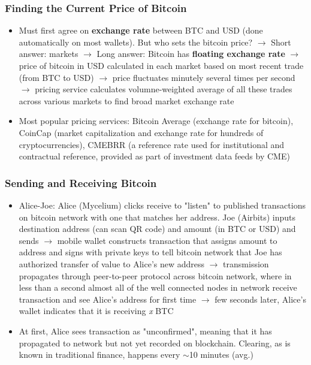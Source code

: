 \documentclass[english, 11pt]{article}
\begin{document}
\subsubsection{Finding the Current Price of Bitcoin}
\begin{itemize}
    \item Must first agree on \textbf{exchange rate} between BTC and USD (done automatically on most wallets). But who sets the bitcoin price? $\rightarrow$ Short answer: markets $\rightarrow$ Long answer: Bitcoin has \textbf{floating exchange rate} $\rightarrow$ price of bitcoin in USD calculated in each market based on most recent trade (from BTC to USD) $\rightarrow$ price fluctuates minutely several times per second $\rightarrow$ pricing service calculates volumne-weighted average of all these trades across various markets to find broad market exchange rate
    \item Most popular pricing services: Bitcoin Average (exchange rate for bitcoin), CoinCap (market capitalization and exchange rate for hundreds of cryptocurrencies), CMEBRR (a reference rate used for institutional and contractual reference, provided as part of investment data feeds by CME)
\end{itemize}

\subsubsection{Sending and Receiving Bitcoin}
\begin{itemize}
    \item Alice-Joe: Alice (Mycelium) clicks receive to "listen" to published transactions on bitcoin network with one that matches her address. Joe (Airbits) inputs destination address (can scan QR code) and amount (in BTC or USD) and sends $\rightarrow$ mobile wallet constructs transaction that assigns amount to address and signs with private keys to tell bitcoin network that Joe has authorized transfer of value to Alice's new address $\rightarrow$ transmission propagates through peer-to-peer protocol across bitcoin network, where in less than a second almost all of the well connected nodes in network receive transaction and see Alice's address for first time $\rightarrow$ few seconds later, Alice's wallet indicates that it is receiving \textit{x} BTC
    \item At first, Alice sees transaction as "unconfirmed", meaning that it has propagated to network but not yet recorded on blockchain. Clearing, as is known in traditional finance, happens every $\sim$10 minutes (avg.)
\end{itemize}
\end{document}
